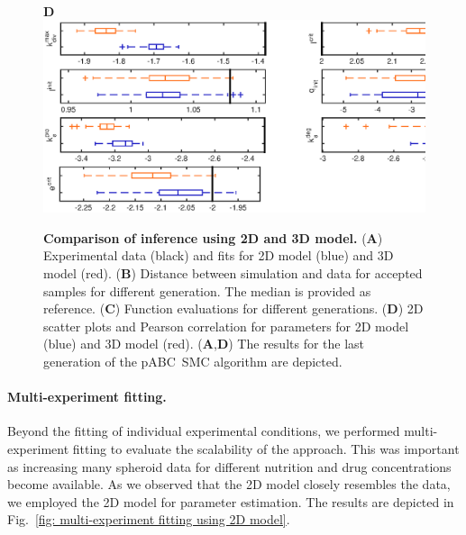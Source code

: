 \documentclass[10pt,letterpaper]{article}
\begin{document}
\begin{figure}[p]
\begin{adjustwidth}{-2in}{0in}
\begin{center}
\begin{minipage}[t]{0.65\textwidth}
\end{minipage}\\
\textbf{D} \\ \includegraphics[width=1.3\textwidth]{Data/TumorXXXdGCKI67ECMindependentBoxplots}
\end{center}
\caption{{\bf Comparison of inference using 2D and 3D model.}
(\textbf{A}) Experimental data (black) and fits for 2D model (blue) and 3D model (red).
(\textbf{B}) Distance between simulation and data for accepted samples for different generation. The median is provided as reference. 
(\textbf{C}) Function evaluations for different generations.
(\textbf{D}) 2D scatter plots and Pearson correlation for parameters for 2D model (blue) and 3D model (red). 
(\textbf{A},\textbf{D}) The results for the last generation of the pABC~SMC algorithm are depicted.
}
\label{fig: fitting of 2D and 3D model to experimental data for case without nutrition limitation}
\end{adjustwidth}
\end{figure}




\paragraph*{Multi-experiment fitting.}
Beyond the fitting of individual experimental conditions, we performed multi-experiment fitting to evaluate the scalability of the approach. This was important as increasing many spheroid data for different nutrition and drug concentrations become available\cite{KwapiszewskaMic2014}. As we observed that the 2D model closely resembles the data, we employed the 2D model for parameter estimation. The results are depicted in Fig.~\ref{fig: multi-experiment fitting using 2D model}.
\end{document}
